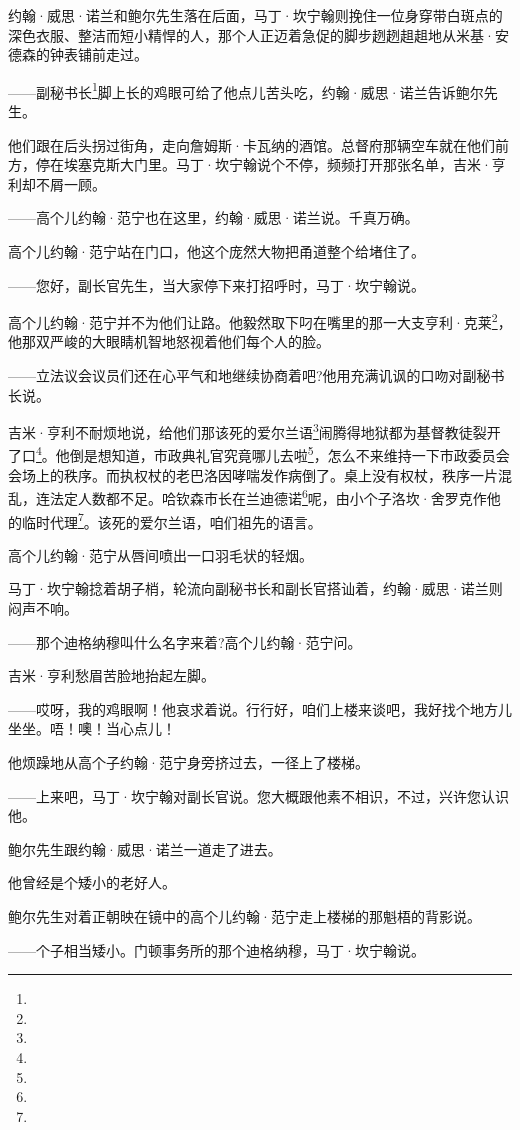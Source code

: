 \par 约翰·威思·诺兰和鲍尔先生落在后面，马丁·坎宁翰则挽住一位身穿带白斑点的深色衣服、整洁而短小精悍的人，那个人正迈着急促的脚步趔趔趄趄地从米基·安德森的钟表铺前走过。
\par ——副秘书长\footnote{}脚上长的鸡眼可给了他点儿苦头吃，约翰·威思·诺兰告诉鲍尔先生。
\par 他们跟在后头拐过街角，走向詹姆斯·卡瓦纳的酒馆。总督府那辆空车就在他们前方，停在埃塞克斯大门里。马丁·坎宁翰说个不停，频频打开那张名单，吉米·亨利却不屑一顾。
\par ——高个儿约翰·范宁也在这里，约翰·威思·诺兰说。千真万确。
\par 高个儿约翰·范宁站在门口，他这个庞然大物把甬道整个给堵住了。
\par ——您好，副长官先生，当大家停下来打招呼时，马丁·坎宁翰说。
\par 高个儿约翰·范宁并不为他们让路。他毅然取下叼在嘴里的那一大支亨利·克莱\footnote{}，他那双严峻的大眼睛机智地怒视着他们每个人的脸。
\par ——立法议会议员们还在心平气和地继续协商着吧?他用充满讥讽的口吻对副秘书长说。
\par 吉米·亨利不耐烦地说，给他们那该死的爱尔兰语\footnote{}闹腾得地狱都为基督教徒裂开了口\footnote{}。他倒是想知道，市政典礼官究竟哪儿去啦\footnote{}，怎么不来维持一下市政委员会会场上的秩序。而执权杖的老巴洛因哮喘发作病倒了。桌上没有权杖，秩序一片混乱，连法定人数都不足。哈钦森市长在兰迪德诺\footnote{}呢，由小个子洛坎·舍罗克作他的临时代理\footnote{}。该死的爱尔兰语，咱们祖先的语言。
\par 高个儿约翰·范宁从唇间喷出一口羽毛状的轻烟。
\par 马丁·坎宁翰捻着胡子梢，轮流向副秘书长和副长官搭讪着，约翰·威思·诺兰则闷声不响。
\par ——那个迪格纳穆叫什么名字来着?高个儿约翰·范宁问。
\par 吉米·亨利愁眉苦脸地抬起左脚。
\par ——哎呀，我的鸡眼啊！他哀求着说。行行好，咱们上楼来谈吧，我好找个地方儿坐坐。唔！噢！当心点儿！
\par 他烦躁地从高个子约翰·范宁身旁挤过去，一径上了楼梯。
\par ——上来吧，马丁·坎宁翰对副长官说。您大概跟他素不相识，不过，兴许您认识他。
\par 鲍尔先生跟约翰·威思·诺兰一道走了进去。
\par 他曾经是个矮小的老好人。
\par 鲍尔先生对着正朝映在镜中的高个儿约翰·范宁走上楼梯的那魁梧的背影说。
\par ——个子相当矮小。门顿事务所的那个迪格纳穆，马丁·坎宁翰说。
